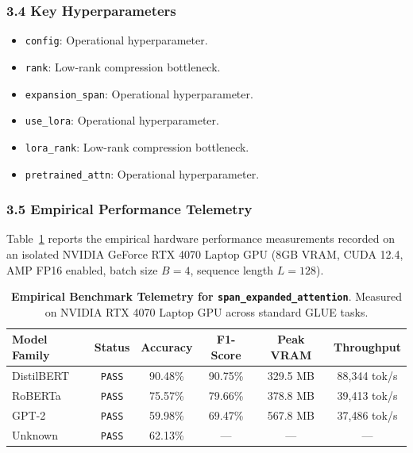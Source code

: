 \subsubsection*{3.4 Key Hyperparameters}
\begin{itemize}
    \item \texttt{config}: Operational hyperparameter.
    \item \texttt{rank}: Low-rank compression bottleneck.
    \item \texttt{expansion\_span}: Operational hyperparameter.
    \item \texttt{use\_lora}: Operational hyperparameter.
    \item \texttt{lora\_rank}: Low-rank compression bottleneck.
    \item \texttt{pretrained\_attn}: Operational hyperparameter.
\end{itemize}

\subsubsection*{3.5 Empirical Performance Telemetry}
Table~\ref{tab:telemetry_span_expanded_attention} reports the empirical hardware performance measurements recorded on an isolated NVIDIA GeForce RTX 4070 Laptop GPU (8GB VRAM, CUDA 12.4, AMP FP16 enabled, batch size $B=4$, sequence length $L=128$).

\begin{table}[h]
\centering
\small
\caption{\textbf{Empirical Benchmark Telemetry for \texttt{span\_expanded\_attention}}. Measured on NVIDIA RTX 4070 Laptop GPU across standard GLUE tasks.}
\label{tab:telemetry_span_expanded_attention}
\begin{tabular*}{\columnwidth}{@{\extracolsep{\fill}}lccccc}
\toprule
\textbf{Model Family} & \textbf{Status} & \textbf{Accuracy} & \textbf{F1-Score} & \textbf{Peak VRAM} & \textbf{Throughput} \\
\midrule
DistilBERT & \texttt{PASS} & 90.48\% & 90.75\% & 329.5 MB & 88,344 tok/s \\
RoBERTa & \texttt{PASS} & 75.57\% & 79.66\% & 378.8 MB & 39,413 tok/s \\
GPT-2 & \texttt{PASS} & 59.98\% & 69.47\% & 567.8 MB & 37,486 tok/s \\
Unknown & \texttt{PASS} & 62.13\% & --- & --- & --- \\
\bottomrule
\end{tabular*}
\end{table}

